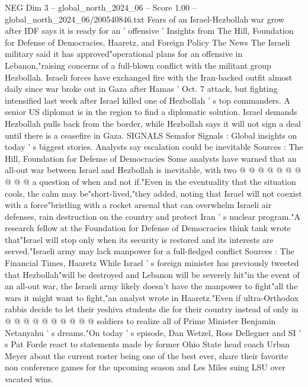 \begin{textsample}{NEG Dim 3 – global\_north\_2024\_06 – Score 1.00 – global\_north\_2024\_06/200540846.txt}  \label{ex:f3_neg_386}
Fears of an Israel-Hezbollah war grow after IDF says it is ready for an ' offensive ' Insights from The Hill, Foundation for Defense of Democracies, Haaretz, and Foreign Policy The News The Israeli military said it has approved"operational plans for an offensive in Lebanon,"raising concerns of a full-blown conflict with the militant group Hezbollah.
Israeli forces have exchanged fire with the Iran-backed outfit almost daily since war broke out in Gaza after Hamas ' Oct. 7 attack, but fighting intensified last week after Israel killed one of Hezbollah ' s top commanders.
A senior US diplomat is in the region to find a diplomatic solution.
Israel demands Hezbollah pulls back from the border, while Hezbollah says it will not sign a deal until there is a ceasefire in Gaza.
SIGNALS Semafor Signals : Global insights on today ' s biggest stories.
Analysts say escalation could be inevitable Sources : The Hill, Foundation for Defense of Democracies Some analysts have warned that an all-out war between Israel and Hezbollah is inevitable, with two @ @ @ @ @ @ @ @ @ @ a question of when and not if."Even in the eventuality that the situation cools, the calm may be"short-lived,"they added, noting that Israel will not coexist with a force"bristling with a rocket arsenal that can overwhelm Israeli air defenses, rain destruction on the country and protect Iran ' s nuclear program."A research fellow at the Foundation for Defense of Democracies think tank wrote that"Israel will stop only when its security is restored and its interests are served."Israeli army may lack manpower for a full-fledged conflict Sources : The Financial Times, Haaretz While Israel ' s foreign minister has previously tweeted that Hezbollah"will be destroyed and Lebanon will be severely hit"in the event of an all-out war, the Israeli army likely doesn't have the manpower to fight"all the wars it might want to fight,"an analyst wrote in Haaretz."Even if ultra-Orthodox rabbis decide to let their yeshiva students die for their country instead of only in @ @ @ @ @ @ @ @ @ @ soldiers to realize all of Prime Minister Benjamin Netanyahu ' s dreams."On today ' s episode, Dan Wetzel, Ross Dellegner and SI ' s Pat Forde react to statements made by former Ohio State head coach Urban Meyer about the current roster being one of the best ever, share their favorite non conference games for the upcoming season and Les Miles suing LSU over vacated wins.

\end{textsample}
